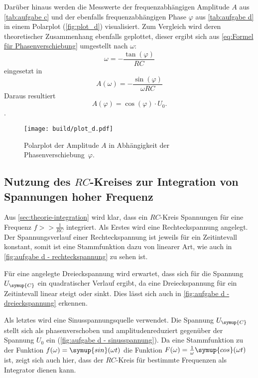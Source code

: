 Darüber hinaus werden die Messwerte der frequenzabhängigen Amplitude $A$ aus \autoref{tab:aufgabe c} und der
ebenfalls frequenzabhängigen Phase $\varphi$ aus \autoref{tab:aufgabe d} in einem Polarplot (\autoref{fig:plot_d})
visualisiert.
Zum Vergleich wird deren theoretischer Zusammenhang ebenfalls geplottet, dieser ergibt sich aus \autoref{eq:Formel für Phasenverschiebung}
umgestellt nach $\omega$:
\begin{equation}
  \omega = -\frac{\tan(\varphi)}{RC}
\end{equation}
eingesetzt in
\begin{equation}
  A(\omega) = -\frac{\sin(\varphi)}{\omega RC}
\end{equation}
Daraus resultiert
\begin{equation}
  A(\varphi) = \cos (\varphi) \cdot U_{0}.
\end{equation}.


\begin{figure} [H]
  \centering
  \texttt{[image: build/plot\_d.pdf]}
  \caption{Polarplot der Amplitude $A$ in Abhängigkeit der Phasenverschiebung~$\varphi$.}
  \label{fig:plot_d}
\end{figure}

\subsection{Nutzung des $RC$-Kreises zur Integration von Spannungen hoher Frequenz}
Aus \autoref{sec:theorie-integration} wird klar, dass ein $RC$-Kreis Spannungen für eine Frequenz $f >> \frac{1}{RC}$
integriert. Als Erstes wird eine Rechteckspannung angelegt. Der Spannungsverlauf einer Rechteckspannung ist jeweils für ein
Zeitintevall konstant, somit ist eine Stammfunktion dazu von linearer Art, wie auch in \autoref{fig:aufgabe d - rechteckspannung}
zu sehen ist.

Für eine angelegte Dreieckspannung wird erwartet, dass sich für die Spannung $U_{\symup{C}}$ ein quadratischer Verlauf ergibt,
da eine Dreieckspannung für ein Zeitintevall linear steigt oder sinkt. Dies lässt sich auch in \autoref{fig:aufgabe d - dreieckspannung}
erkennen.

Als letztes wird eine Sinusspannungsquelle verwendet. Die Spannung $U_{\symup{C}}$ stellt sich als phasenverschoben
und amplitudenreduziert gegenüber der Spannung $U_{0}$ ein (\autoref{fig:aufgabe d - sinusspannung}). Da eine
Stammfunktion zu der Funktion $f(\omega)=\symup{sin}(\omega t)$ die Funktion $F(\omega) = \frac{1}{\omega}\symup{cos}(\omega t)$ ist,
zeigt sich auch hier, dass der $RC$-Kreis für bestimmte Frequenzen als Integrator dienen kann.


